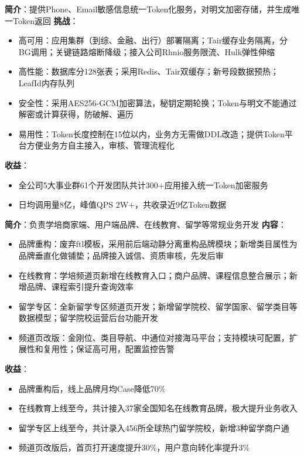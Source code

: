 \documentclass{resume}
\begin{document}
    \begin{onehalfspacing}
        \textbf{简介}：提供Phone、Email敏感信息统一Token化服务，对明文加密存储，并生成唯一Token返回\newline
        \textbf{挑战}：
        \begin{itemize}
            \item 高可用：应用集群（到综、金融、出行）部署隔离；Tair缓存业务隔离，分BG调用；关键链路熔断降级；接入公司Rhnio服务限流、Hulk弹性伸缩
            \item 高性能：数据库分128张表；采用Redis、Tair双缓存；新号段数据预热；LeafId内存队列
            \item 安全性：采用AES256-GCM加密算法，秘钥定期轮换；Token与明文不能通过解密或计算获得，防破解、遍历
            \item 易用性：Token长度控制在15位以内，业务方无需做DDL改造；提供Token平台方便业务方自主接入，审核、管理流程化
        \end{itemize}
        \textbf{收益}：
        \begin{itemize}
            \item 全公司5大事业群61个开发团队共计300+应用接入统一Token加密服务
            \item 日均调用量8亿，峰值QPS 2W+，共收录近9亿Token数据
        \end{itemize}
    \end{onehalfspacing}
    \blankline{ }

    \begin{onehalfspacing}
        \textbf{简介}：负责学培商家端、用户端品牌、在线教育、留学等常规业务开发\newline
        \textbf{内容}：
        \begin{itemize}
            \item 品牌重构：废弃ftl模板，采用前后端动静分离重构品牌模块；新增类目属性为品牌垂直化做铺垫；品牌接入诚信、资质审核，先发后审
            \item 在线教育：学培频道页新增在线教育入口；商户品牌、课程信息整合展示；新增品牌、课程索引提升查询效率
            \item 留学专区：全新留学专区频道页开发；新增留学院校、留学国家、留学类目等数据模型；留学院校运营后台功能开发
            \item 频道页改版：金刚位、类目导航、中通位对接海马平台；支持模块可配置，扩展性和复用性；保证高可用，配置监控告警
        \end{itemize}
        \textbf{收益}：
        \begin{itemize}
            \item 品牌重构后，线上品牌月均Case降低70\%
            \item 在线教育上线至今，共计接入37家全国知名在线教育品牌，极大提升业务收入
            \item 留学专区上线至今，共计录入456所全球热门留学院校，新增3种留学商户通
            \item 频道页改版后，首页打开速度提升30\%，用户意向转化率提升3\%
        \end{itemize}
    \end{onehalfspacing}
    \blankline{ }
\end{document}
